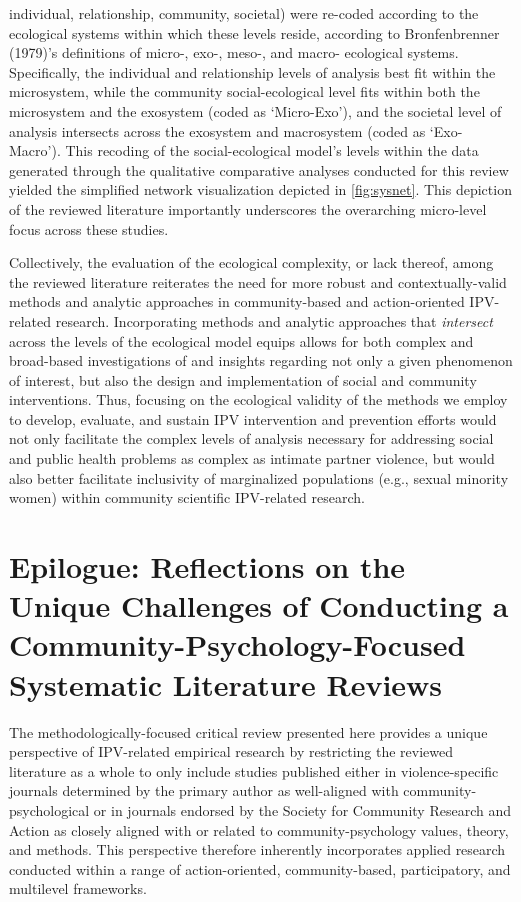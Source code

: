 \documentclass[11pt,]{tufte-book}
\begin{document}
individual, relationship, community, societal) were re-coded according
to the ecological systems within which these levels reside, according to
Bronfenbrenner (1979)'s definitions of micro-, exo-, meso-, and macro-
ecological systems. Specifically, the individual and relationship levels
of analysis best fit within the microsystem, while the community
social-ecological level fits within both the microsystem and the
exosystem (coded as `Micro-Exo'), and the societal level of analysis
intersects across the exosystem and macrosystem (coded as `Exo-Macro').
This recoding of the social-ecological model's levels within the data
generated through the qualitative comparative analyses conducted for
this review yielded the simplified network visualization depicted in
\cref{fig:sysnet}. This depiction of the reviewed
literature importantly underscores the overarching micro-level focus
across these studies.

Collectively, the evaluation of the ecological complexity, or lack
thereof, among the reviewed literature reiterates the need for more
robust and contextually-valid methods and analytic approaches in
community-based and action-oriented IPV-related research. Incorporating
methods and analytic approaches that \emph{intersect} across the levels
of the ecological model equips allows for both complex and broad-based
investigations of and insights regarding not only a given phenomenon of
interest, but also the design and implementation of social and community
interventions. Thus, focusing on the ecological validity of the methods
we employ to develop, evaluate, and sustain IPV intervention and
prevention efforts would not only facilitate the complex levels of
analysis necessary for addressing social and public health problems as
complex as intimate partner violence, but would also better facilitate
inclusivity of marginalized populations (e.g., sexual minority women)
within community scientific IPV-related research.

\chapter{Epilogue: Reflections on the Unique Challenges of Conducting a
Community-Psychology-Focused Systematic Literature
Reviews}\label{epilogue-reflections-on-the-unique-challenges-of-conducting-a-community-psychology-focused-systematic-literature-reviews}

The methodologically-focused critical review presented here provides a
unique perspective of IPV-related empirical research by restricting the
reviewed literature as a whole to only include studies published either
in violence-specific journals determined by the primary author as
well-aligned with community-psychological or in journals endorsed by the
Society for Community Research and Action as closely aligned with or
related to community-psychology values, theory, and methods. This
perspective therefore inherently incorporates applied research conducted
within a range of action-oriented, community-based, participatory, and
multilevel frameworks.
\end{document}
